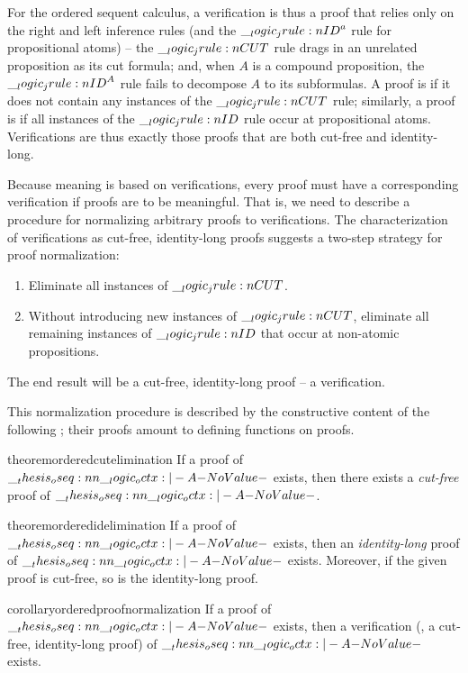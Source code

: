 For the ordered sequent calculus, a verification is thus a proof that relies only on the right and left inference rules (and the $\__logic_jrule:n {ID}^{a}$ rule for propositional atoms) -- the $\__logic_jrule:n {CUT}$ rule drags in an unrelated proposition as its cut formula; and, when $A$ is a compound proposition, the $\__logic_jrule:n {ID}^A$ rule fails to decompose $A$ to its subformulas.
A proof is  if it does not contain any instances of the $\__logic_jrule:n {CUT}$ rule; similarly, a proof is  if all instances of the $\__logic_jrule:n {ID}$ rule occur at propositional atoms.
Verifications are thus exactly those proofs that are both cut-free and identity-long.

Because meaning is based on verifications, every proof must have a corresponding verification if proofs are to be meaningful.
That is, we need to describe a procedure for normalizing arbitrary proofs to verifications.
The characterization of verifications as cut-free, identity-long proofs suggests a two-step strategy for proof normalization:
\begin{enumerate}[topsep=.33\baselineskip, noitemsep]
  \label{list:ordered-logic:normalization}
\item Eliminate all instances of $\__logic_jrule:n {CUT}$.
\item Without introducing new instances of $\__logic_jrule:n {CUT}$, eliminate all remaining instances of $\__logic_jrule:n {ID}$ that occur at non-atomic propositions.
\end{enumerate}
The end result will be a cut-free, identity-long proof -- a verification.

This normalization procedure is described by the constructive content of the following ; their proofs amount to defining functions on proofs.%
%
\begin{restatable*}[
      name=Cut elimination,
      label=thm:ordered-logic:cut-elimination
    ]{theorem}{orderedcutelimination}
      If a proof of\/ $\oseq{\octx |- A}$ exists, then there exists a \emph{cut-free} proof of\/ $\oseq{\octx |- A}$.
    \end{restatable*}
%
\begin{restatable*}[
      name=Identity elimination,
      label=thm:ordered-logic:id-elimination
    ]{theorem}{orderedidelimination}
      If a proof of\/ $\oseq{\octx |- A}$ exists, then an \emph{identity-long} proof of\/ $\oseq{\octx |- A}$ exists.
      Moreover, if the given proof is cut-free, so is the identity-long proof.
    \end{restatable*}
%
\begin{restatable*}[
  name=Proof normalization,
  label=cor:ordered-logic:proof-normalization
]{corollary}{orderedproofnormalization}
  If a proof of\/ $\oseq{\octx |- A}$ exists, then a verification (\ie, a cut-free, identity-long proof) of\/ $\oseq{\octx |- A}$ exists.
\end{restatable*}

